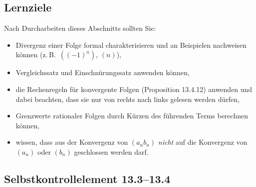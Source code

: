 \documentclass[a4paper,12pt]{article}
\begin{document}
\begin{center}
\end{center}

\subsection*{Lernziele}

Nach Durcharbeiten dieses Abschnitts sollten Sie:
\begin{itemize}
  \item Divergenz einer Folge formal charakterisieren und an Beispielen nachweisen können
        (z.\,B.\ $((-1)^n)$, $(n)$),
  \item Vergleichssatz und Einschnürungssatz anwenden können,
  \item die Rechenregeln für konvergente Folgen (Proposition 13.4.12) anwenden und dabei
        beachten, dass sie nur von rechts nach links gelesen werden dürfen,
  \item Grenzwerte rationaler Folgen durch Kürzen des führenden Terms berechnen können,
  \item wissen, dass aus der Konvergenz von $(a_n b_n)$ \emph{nicht} auf die Konvergenz
        von $(a_n)$ oder $(b_n)$ geschlossen werden darf.
\end{itemize}

\subsection*{Selbstkontrollelement 13.3--13.4}
\end{document}
